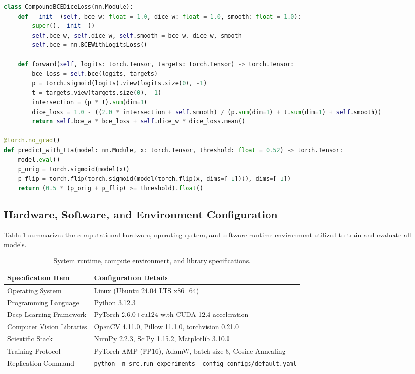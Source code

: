 \documentclass[10pt,a4paper]{article}
\begin{document}
\begin{lstlisting}[language=Python, caption={PyTorch compound BCE-Dice objective and test-time augmentation inference routine.}, label={lst:loss_tta_code}]
class CompoundBCEDiceLoss(nn.Module):
    def __init__(self, bce_w: float = 1.0, dice_w: float = 1.0, smooth: float = 1.0):
        super().__init__()
        self.bce_w, self.dice_w, self.smooth = bce_w, dice_w, smooth
        self.bce = nn.BCEWithLogitsLoss()

    def forward(self, logits: torch.Tensor, targets: torch.Tensor) -> torch.Tensor:
        bce_loss = self.bce(logits, targets)
        p = torch.sigmoid(logits).view(logits.size(0), -1)
        t = targets.view(targets.size(0), -1)
        intersection = (p * t).sum(dim=1)
        dice_loss = 1.0 - ((2.0 * intersection + self.smooth) / (p.sum(dim=1) + t.sum(dim=1) + self.smooth))
        return self.bce_w * bce_loss + self.dice_w * dice_loss.mean()

@torch.no_grad()
def predict_with_tta(model: nn.Module, x: torch.Tensor, threshold: float = 0.52) -> torch.Tensor:
    model.eval()
    p_orig = torch.sigmoid(model(x))
    p_flip = torch.flip(torch.sigmoid(model(torch.flip(x, dims=[-1]))), dims=[-1])
    return (0.5 * (p_orig + p_flip) >= threshold).float()
\end{lstlisting}

\subsection{Hardware, Software, and Environment Configuration}
Table \ref{tab:environment_specs} summarizes the computational hardware, operating system, and software runtime environment utilized to train and evaluate all models.

\begin{table}[htbp]
\centering
\scriptsize
\setlength{\tabcolsep}{4pt}
\caption{System runtime, compute environment, and library specifications.}
\label{tab:environment_specs}
\begin{tabularx}{\linewidth}{l X}
\toprule
\textbf{Specification Item} & \textbf{Configuration Details} \\
\midrule
Operating System & Linux (Ubuntu 24.04 LTS x86\_64) \\
Programming Language & Python 3.12.3 \\
Deep Learning Framework & PyTorch 2.6.0+cu124 with CUDA 12.4 acceleration \\
Computer Vision Libraries & OpenCV 4.11.0, Pillow 11.1.0, torchvision 0.21.0 \\
Scientific Stack & NumPy 2.2.3, SciPy 1.15.2, Matplotlib 3.10.0 \\
Training Protocol & PyTorch AMP (FP16), AdamW, batch size 8, Cosine Annealing \\
Replication Command & \texttt{python -m src.run\_experiments --config configs/default.yaml} \\
\bottomrule
\end{tabularx}
\end{table}
\end{document}
